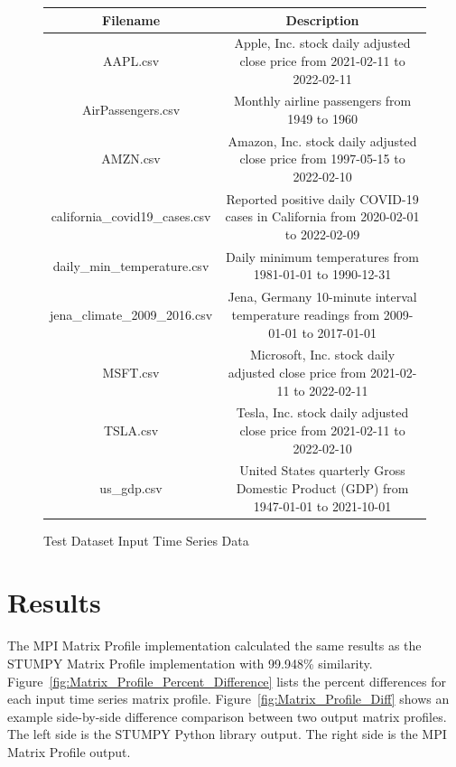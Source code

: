 \documentclass[conference]{IEEEtran}
\begin{document}
\begin{center}
\begin{figure}
\caption{Test Dataset Input Time Series Data}
\begin{tabular}{|c|c|}
\hline
\textbf{Filename} & \textbf{Description} \\ \hline \hline
AAPL.csv & Apple, Inc. stock daily adjusted close price from 2021-02-11 to 2022-02-11 \\ \hline
AirPassengers.csv &  Monthly airline passengers from 1949 to 1960 \\ \hline
AMZN.csv & Amazon, Inc. stock daily adjusted close price from 1997-05-15 to 2022-02-10 \\ \hline
california\_covid19\_cases.csv & Reported positive daily COVID-19 cases in California from 2020-02-01 to 2022-02-09 \\ \hline
daily\_min\_temperature.csv & Daily minimum temperatures from 1981-01-01 to 1990-12-31  \\ \hline
jena\_climate\_2009\_2016.csv & Jena, Germany 10-minute interval temperature readings from 2009-01-01 to 2017-01-01  \\ \hline
MSFT.csv & Microsoft, Inc. stock daily adjusted close price from 2021-02-11 to 2022-02-11 \\ \hline
TSLA.csv & Tesla, Inc. stock daily adjusted close price from 2021-02-11 to 2022-02-10 \\ \hline
us\_gdp.csv & United States quarterly Gross Domestic Product (GDP) from 1947-01-01 to 2021-10-01 \\ \hline
\hline
\end{tabular}
\label{fig:Input_Time_Series}
\end{figure}
\end{center}

\section{Results}

The MPI Matrix Profile implementation calculated the same results as the STUMPY Matrix Profile implementation with 99.948\% similarity.  Figure~\ref{fig:Matrix_Profile_Percent_Difference} lists the percent differences for each input time series matrix profile. Figure~\ref{fig:Matrix_Profile_Diff} shows an example side-by-side difference comparison between two output matrix profiles.  The left side is the STUMPY Python library output.  The right side is the MPI Matrix Profile output.
\end{document}
